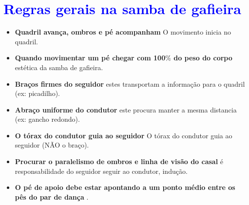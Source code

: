 \section{\textcolor{blue}{Regras gerais na samba de gafieira}}


\begin{itemize}
\item \textbf{Quadril avança, ombros e pé acompanham}  O movimento inicia no quadril.
\item \textbf{Quando movimentar um pé chegar com 100$\%$ do peso do corpo} estética da samba de gafieira.
\item \textbf{Braços firmes do seguidor} estes transportam a informação para o quadril (ex: picadilho).
\item \textbf{Abraço uniforme do condutor} este procura manter a mesma distancia (ex: gancho redondo).
\item \textbf{O tórax do condutor guia ao seguidor} O tórax do condutor guia ao seguidor (NÃO o braço).
\item \textbf{Procurar o paralelismo de ombros e linha de visão do casal} é responsabilidade do seguidor seguir ao condutor, indução.
\item \textbf{O pé de apoio debe estar apontando a um ponto médio entre os pês do par de dança} .
\end{itemize}
